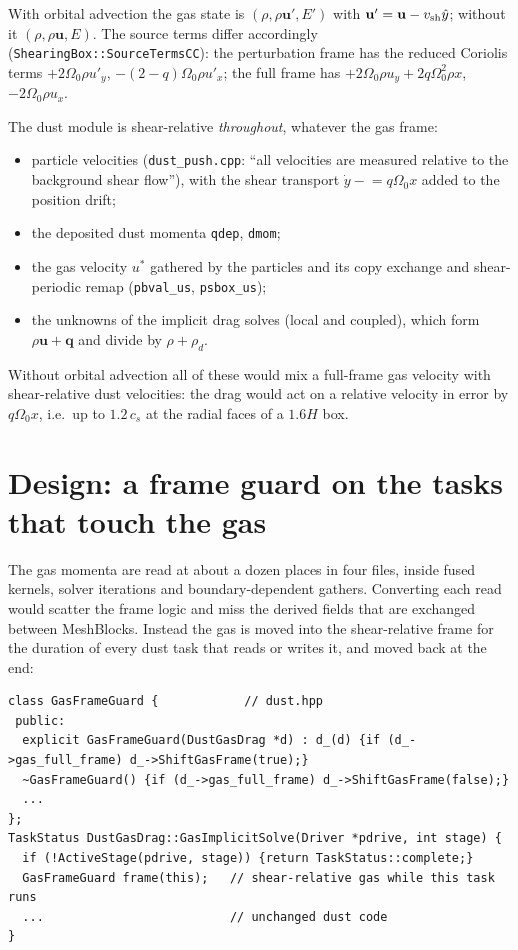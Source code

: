 \documentclass[11pt]{article}
\newcommand{\code}[1]{\texttt{#1}}
\newcommand{\file}[1]{\texttt{\small #1}}
\newcommand{\fn}[1]{\texttt{\small #1}}
\newcommand{\Om}{\Omega_0}
\newcommand{\qom}{q\Om}
\newcommand{\vsh}{v_{\rm sh}}
\begin{document}
With orbital advection the gas state is $(\rho, \rho\mathbf{u}', E')$ with
$\mathbf{u}' = \mathbf{u} - \vsh\hat{y}$; without it $(\rho, \rho\mathbf{u}, E)$.  The
source terms differ accordingly (\fn{ShearingBox::SourceTermsCC}): the perturbation frame
has the reduced Coriolis terms $+2\Om\rho u'_y$, $-(2-q)\Om\rho u'_x$; the full frame has
$+2\Om\rho u_y + 2q\Om^2\rho x$, $-2\Om\rho u_x$.

The dust module is shear-relative \emph{throughout}, whatever the gas frame:
\begin{itemize}
\item particle velocities (\file{dust\_push.cpp}: ``all velocities are measured relative
  to the background shear flow''), with the shear transport $\dot y \mathrel{-}= \qom x$
  added to the position drift;
\item the deposited dust momenta \code{qdep}, \code{dmom};
\item the gas velocity $u^\ast$ gathered by the particles and its copy exchange and
  shear-periodic remap (\code{pbval\_us}, \code{psbox\_us});
\item the unknowns of the implicit drag solves (local and coupled), which form
  $\rho\mathbf{u} + \mathbf{q}$ and divide by $\rho+\rho_d$.
\end{itemize}
Without orbital advection all of these would mix a full-frame gas velocity with
shear-relative dust velocities: the drag would act on a relative velocity in error by
$\qom x$, i.e.\ up to $1.2\,c_s$ at the radial faces of a $1.6H$ box.

\section{Design: a frame guard on the tasks that touch the gas}

The gas momenta are read at about a dozen places in four files, inside fused kernels,
solver iterations and boundary-dependent gathers.  Converting each read would scatter the
frame logic and miss the derived fields that are exchanged between MeshBlocks.  Instead
the gas is moved into the shear-relative frame for the duration of every dust task that
reads or writes it, and moved back at the end:

\begin{lstlisting}
class GasFrameGuard {            // dust.hpp
 public:
  explicit GasFrameGuard(DustGasDrag *d) : d_(d) {if (d_->gas_full_frame) d_->ShiftGasFrame(true);}
  ~GasFrameGuard() {if (d_->gas_full_frame) d_->ShiftGasFrame(false);}
  ...
};
TaskStatus DustGasDrag::GasImplicitSolve(Driver *pdrive, int stage) {
  if (!ActiveStage(pdrive, stage)) {return TaskStatus::complete;}
  GasFrameGuard frame(this);   // shear-relative gas while this task runs
  ...                          // unchanged dust code
}
\end{lstlisting}
\end{document}
